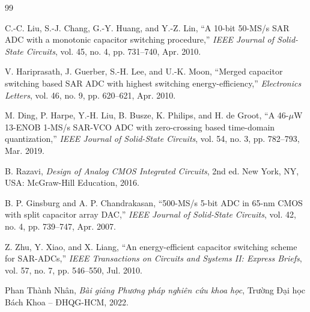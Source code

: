 \documentclass[12pt,a4paper]{article}
\begin{document}
\newpage
\begin{thebibliography}{99}

C.-C. Liu, S.-J. Chang, G.-Y. Huang, and Y.-Z. Lin, 
\newblock ``A 10-bit 50-MS/s SAR ADC with a monotonic capacitor switching procedure,''
\newblock \emph{IEEE Journal of Solid-State Circuits}, vol. 45, no. 4, pp. 731--740, Apr. 2010.

V. Hariprasath, J. Guerber, S.-H. Lee, and U.-K. Moon,
\newblock ``Merged capacitor switching based SAR ADC with highest switching energy-efficiency,''
\newblock \emph{Electronics Letters}, vol. 46, no. 9, pp. 620--621, Apr. 2010.

M. Ding, P. Harpe, Y.-H. Liu, B. Busze, K. Philips, and H. de Groot,
\newblock ``A 46-$\mu$W 13-ENOB 1-MS/s SAR-VCO ADC with zero-crossing based time-domain quantization,''
\newblock \emph{IEEE Journal of Solid-State Circuits}, vol. 54, no. 3, pp. 782--793, Mar. 2019.

B. Razavi,
\newblock \emph{Design of Analog CMOS Integrated Circuits}, 2nd ed.
\newblock New York, NY, USA: McGraw-Hill Education, 2016.

B. P. Ginsburg and A. P. Chandrakasan,
\newblock ``500-MS/s 5-bit ADC in 65-nm CMOS with split capacitor array DAC,''
\newblock \emph{IEEE Journal of Solid-State Circuits}, vol. 42, no. 4, pp. 739--747, Apr. 2007.

Z. Zhu, Y. Xiao, and X. Liang,
\newblock ``An energy-efficient capacitor switching scheme for SAR-ADCs,''
\newblock \emph{IEEE Transactions on Circuits and Systems II: Express Briefs}, vol. 57, no. 7, pp. 546--550, Jul. 2010.

Phan Thành Nhân,
\newblock \emph{Bài giảng Phương pháp nghiên cứu khoa học},
\newblock Trường Đại học Bách Khoa -- ĐHQG-HCM, 2022.

\end{thebibliography}
\end{document}

